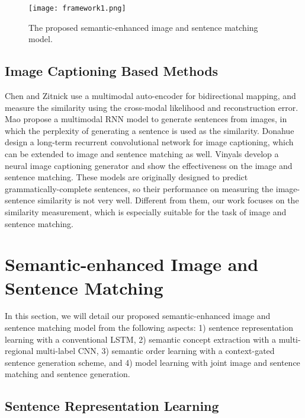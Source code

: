 \documentclass[10pt,twocolumn,letterpaper]{article}
\begin{document}
\begin{figure*}[t]

\centering
\texttt{[image: framework1.png]}
\caption{The proposed semantic-enhanced image and sentence matching model.}
\label{figure:framework}
\end{figure*}


\subsection{Image Captioning Based Methods}

Chen and Zitnick \cite{chen2015mind} use a multimodal auto-encoder for bidirectional mapping,
and measure the similarity using the cross-modal likelihood and reconstruction error.
Mao \etal \cite{mao2014explain} propose a multimodal RNN model
to generate sentences from images,
in which the perplexity of generating a sentence is used as the similarity.
Donahue \etal \cite{donahue2015long} design a long-term recurrent convolutional network
for image captioning, which can be extended to image and sentence matching as well.
Vinyals \etal \cite{vinyals2017show} develop a neural image captioning generator and
show the effectiveness on the image and sentence matching.
These models are originally designed to
predict grammatically-complete sentences,
so their performance on measuring the image-sentence similarity is not very well.
Different from them, our work focuses on the similarity measurement,
which is especially suitable for the task of image and sentence matching.




\section{Semantic-enhanced Image and Sentence Matching}

In this section, we will detail our proposed semantic-enhanced image and sentence matching
model from the following aspects:
1) sentence representation learning with a conventional LSTM,
2) semantic concept extraction with a multi-regional multi-label CNN,
3) semantic order learning with a context-gated sentence generation scheme,
and 4) model learning with joint image and sentence matching and sentence generation.





\subsection{Sentence Representation Learning}
\end{document}
